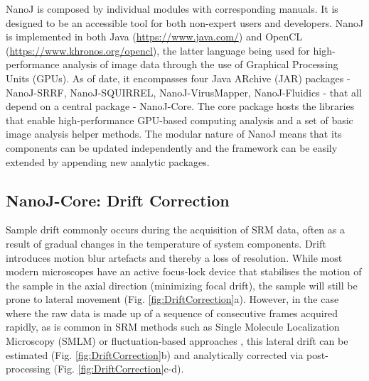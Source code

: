  NanoJ is composed by individual modules with corresponding manuals. It is designed to be an accessible tool for both non-expert users and developers. NanoJ is implemented in both Java (\href{https://www.java.com/}{https://www.java.com/}) and OpenCL (\href{https://www.khronos.org/opencl}{https://www.khronos.org/opencl}), the latter language being used for high-performance analysis of image data through the use of Graphical Processing Units (GPUs). As of date, it encompasses four Java ARchive (JAR) packages - NanoJ-SRRF, NanoJ-SQUIRREL, NanoJ-VirusMapper, NanoJ-Fluidics - that all depend on a central package - NanoJ-Core. The core package hosts the libraries that enable high-performance GPU-based computing analysis and a set of basic image analysis helper methods. The modular nature of NanoJ means that its components can be updated independently and the framework can be easily extended by appending new analytic packages.

\subsection*{NanoJ-Core: Drift Correction}
Sample drift commonly occurs during the acquisition of SRM data, often as a result of gradual changes in the temperature of system components. Drift introduces motion blur artefacts and thereby a loss of resolution. While most modern microscopes have an active focus-lock device that stabilises the motion of the sample in the axial direction (minimizing focal drift), the sample will still be prone to lateral movement (Fig. \ref{fig:DriftCorrection}a). However, in the case where the raw data is made up of a sequence of consecutive frames acquired rapidly, as is common in SRM methods such as Single Molecule Localization Microscopy (SMLM) \cite{betzig2006imaging,rust2006sub} or fluctuation-based approaches \cite{gustafsson2016fast,dertinger2009fast,cox2012bayesian}, this lateral drift can be estimated (Fig. \ref{fig:DriftCorrection}b) and analytically corrected via post-processing (Fig. \ref{fig:DriftCorrection}c-d).
 
